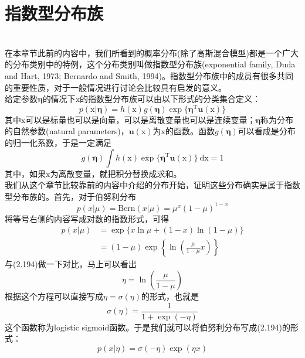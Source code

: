 \documentclass[b5paper]{book}
\numberwithin{equation}{chapter}
\newcommand {\bx} {\boldsymbol{\mathrm{x}}}
\newcommand {\rmT} {\mathrm{T}}
\newcommand {\bfeta} {\boldsymbol{\eta}}
\newcommand {\insertline} {\noindent{\color{red} \rule[5pt]{\textwidth}{0.1em}}}
\begin{document}
	\section{指数型分布族}
	\insertline\\
	\textnormal{
	\indent 在本章节此前的内容中，我们所看到的概率分布(除了高斯混合模型)都是一个广大的分布类别中的特例，这个分布类别叫做指数型分布族(exponential family, Duda and Hart, 1973; Bernardo and Smith, 1994)。指数型分布族中的成员有很多共同的重要性质，对于一般情况进行讨论会比较具有启发的意义。\\
	\indent 给定参数$\bfeta$的情况下$\bx$的指数型分布族可以由以下形式的分类集合定义：
	\begin{equation}
		p(\bx|\bfeta)=h(\bx)g(\bfeta)\exp\{\bfeta^{\rmT}\mathbf{u}(\bx)\}
	\end{equation}
	其中$\bx$可以是标量也可以是向量，可以是离散变量也可以是连续变量；$\bfeta$称为分布的自然参数(natural parameters)，$\mathbf{u}(\bx)$为$\bx$的函数。函数$g(\bfeta)$可以看成是分布的归一化系数，于是一定满足
	\begin{equation}
		g(\bfeta)\int h(\bx)\exp \{\bfeta^{\rmT}\mathbf{u}(\bx)\}\ \mathrm{d}\bx = 1
	\end{equation}
	其中，如果$\bx$为离散变量，就把积分替换成求和。\\
	\indent 我们从这个章节比较靠前的内容中介绍的分布开始，证明这些分布确实是属于指数型分布族的。首先，对于伯努利分布
	\begin{equation}
		p(x|\mu)=\mathrm{Bern}(x|\mu)=\mu^x(1-\mu)^{1-x}
	\end{equation}
	将等号右侧的内容写成对数的指数形式，可得
	\begin{equation}
	\begin{split}
		p(x|\mu) &= \exp\{x\ln \mu + (1-x)\ln (1-\mu)\}\\
		&= (1-\mu) \exp\left\{\ln \left(\frac{\mu}{1-\mu}x\right)\right\}
	\end{split}
	\end{equation}
	与(2.194)做一下对比，马上可以看出
	\begin{equation}
		\eta=\ln (\frac{\mu}{1-\mu})
	\end{equation}
	根据这个方程可以直接写成$\eta=\sigma(\eta)$的形式，也就是
	\begin{equation}
		\sigma(\eta)=\frac{1}{1+\exp(-\eta)}
	\end{equation}
	这个函数称为logistic sigmoid函数。于是我们就可以将伯努利分布写成(2.194)的形式：
	\begin{equation}
		p(x|\eta)=\sigma(-\eta)\exp(\eta x)

\end{equation}}
\end{document}
